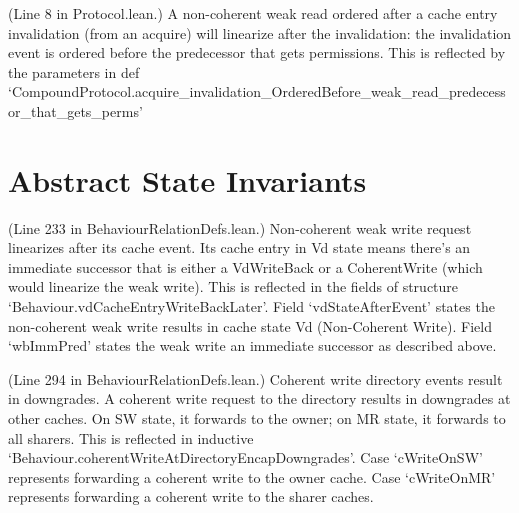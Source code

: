 \begin{definition}
  \label{def:acquire_invalidation_ob_weak_read}
  \leanok
  (Line 8 in Protocol.lean.)
  A non-coherent weak read ordered after a cache entry invalidation (from an
  acquire) will linearize after the invalidation: the invalidation event is
  ordered before the predecessor that gets permissions.
  This is reflected by the parameters in def `CompoundProtocol.acquire\_invalidation\_OrderedBefore\_weak\_read\_predecessor\_that\_gets\_perms'
\end{definition}

\section{Abstract State Invariants}
\label{sec:axioms:abstract-state}

\begin{definition}
  \label{def:vdCacheEntryWBOrGetSWLaterWrapper}
  \leanok
  (Line 233 in BehaviourRelationDefs.lean.)
  Non-coherent weak write request linearizes after its cache event.
  Its cache entry in Vd state means there's an immediate successor that is
  either a VdWriteBack or a CoherentWrite (which would linearize the weak write).
  This is reflected in the fields of structure `Behaviour.vdCacheEntryWriteBackLater'.
  Field `vdStateAfterEvent' states the non-coherent weak write results
  in cache state Vd (Non-Coherent Write).
  Field `wbImmPred' states the weak write an immediate successor as described above.
\end{definition}

\begin{definition}
  \label{def:coherentWriteAtDirectoryEncapDowngrades}
  \leanok
  (Line 294 in BehaviourRelationDefs.lean.)
  Coherent write directory events result in downgrades.
  A coherent write request to the directory results in downgrades at other
  caches. On SW state, it forwards to the owner; on MR state, it forwards
  to all sharers.
  This is reflected in inductive `Behaviour.coherentWriteAtDirectoryEncapDowngrades'.
  Case `cWriteOnSW' represents forwarding a coherent write to the owner cache.
  Case `cWriteOnMR' represents forwarding a coherent write to the sharer caches.
\end{definition}

